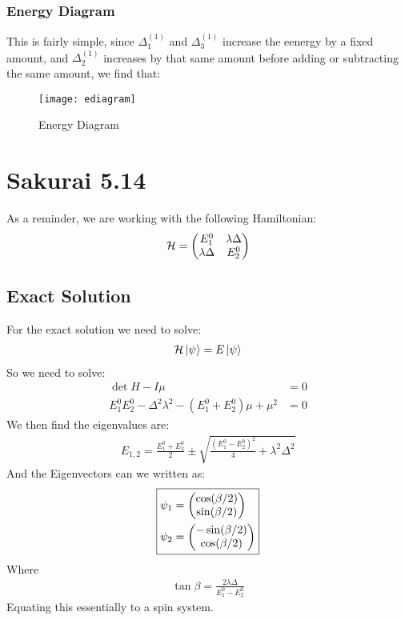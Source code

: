 \documentclass[12pt]{article}
\renewcommand{\H}{\mathcal{H}}
\begin{document}
\subsubsection{Energy Diagram}
This is fairly simple, since $\Delta_1^{(1)}$ and $\Delta_3^{(1)}$ increase the eenergy by a fixed amount, and $\Delta_2^{(1)}$ increases by that same amount before adding or subtracting the same amount, we find that:
\begin{figure}[H]
  \centering
  \texttt{[image: ediagram]}
  \caption{Energy Diagram}
\end{figure}

\section{Sakurai 5.14}
As a reminder, we are working with the following Hamiltonian:
\begin{align*}
  \H=\pmqty{E_1^0&\lambda\Delta\\\lambda\Delta&E_2^0}
\end{align*}

\subsection{Exact Solution}
For the exact solution we need to solve:
\begin{align*}
  \H\ket{\psi}=E\ket{\psi}
\end{align*}
So we need to solve:
\begin{align*}
  \det{H-I\mu}&=0\\
  E_1^0E_2^0-\Delta^2\lambda^2-(E_1^0+E_2^0)\mu+\mu^2&=0
\end{align*}
We then find the eigenvalues are:
\begin{align}
  \boxed{E_{1,2}=\frac{E_1^0+E_{2}^0}2\pm
  \sqrt{\frac{(E_1^0-E_2^0)^2}{4}+\lambda^2\Delta^2}}
\end{align}
And the Eigenvectors can we written as:
\begin{align}
  \boxed{\begin{aligned}
    \psi_1&=\pmqty{\cos(\beta/2)\\\sin(\beta/2)}\\
    \psi_2&=\pmqty{-\sin(\beta/2)\\\cos(\beta/2)}
  \end{aligned}}
\end{align}
Where
\begin{align*}
  \tan\beta=\frac{2\lambda\Delta}{E_1^0-E_2^0}
\end{align*}
Equating this essentially to a spin system.
\end{document}
